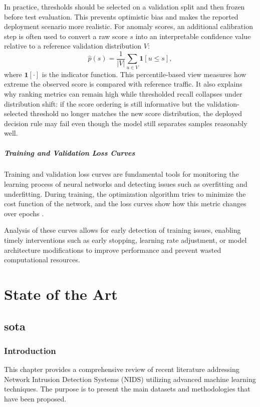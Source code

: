 \documentclass[12pt, a4paper]{report}
\begin{document}
In practice, thresholds should be selected on a validation split and then frozen before test evaluation. This prevents optimistic bias and makes the reported deployment scenario more realistic. For anomaly scores, an additional calibration step is often used to convert a raw score $s$ into an interpretable confidence value relative to a reference validation distribution $V$:
\begin{equation}
\hat{p}(s)=\frac{1}{|V|}\sum_{u\in V} \mathbf{1}[u \le s],
\end{equation}
where $\mathbf{1}[\cdot]$ is the indicator function. This percentile-based view measures how extreme the observed score is compared with reference traffic. It also explains why ranking metrics can remain high while thresholded recall collapses under distribution shift: if the score ordering is still informative but the validation-selected threshold no longer matches the new score distribution, the deployed decision rule may fail even though the model still separates samples reasonably well.

\subsubsection{Training and Validation Loss Curves}
Training and validation loss curves are fundamental tools for monitoring the learning process of neural networks and detecting issues such as overfitting and underfitting. During training, the optimization algorithm tries to minimize the cost function of the network, and the loss curves show how this metric changes over epochs .

Analysis of these curves allows for early detection of training issues, enabling timely interventions such as early stopping, learning rate adjustment, or model architecture modifications to improve performance and prevent wasted computational resources.








\part{State of the Art}
\chapter{sota}
\section{Introduction}
This chapter provides a comprehensive review of recent literature addressing Network Intrusion Detection Systems (NIDS) utilizing advanced machine learning techniques. The purpose is to present the main datasets and methodologies that have been proposed. 
\end{document}
